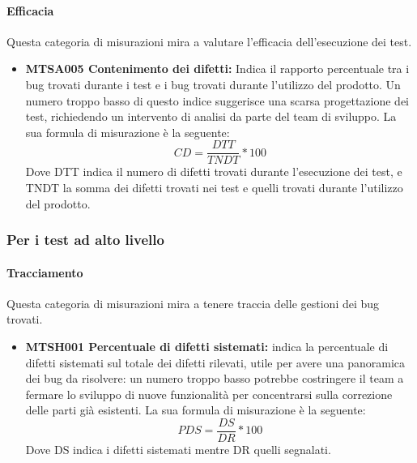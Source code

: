 \documentclass[NormeDiProgetto.tex]{subfiles}
\begin{document}
	\paragraph{Efficacia}
	Questa categoria di misurazioni mira a valutare l'efficacia dell'esecuzione dei test.
	\begin{itemize}
		\item \textbf{MTSA005 Contenimento dei difetti:} Indica il rapporto percentuale tra i bug trovati durante i test e i bug trovati durante l'utilizzo del prodotto. Un numero troppo basso di questo indice suggerisce una scarsa progettazione dei test, richiedendo un intervento di analisi da parte del team di sviluppo. La sua formula di misurazione è la seguente:
		\[CD=\dfrac{DTT}{TNDT}*100\]
		Dove DTT indica il numero di difetti trovati durante l'esecuzione dei test, e TNDT la somma dei difetti trovati nei test e quelli trovati durante l'utilizzo del prodotto.
	\end{itemize}
	
	\subsubsection{Per i test ad alto livello}
	\paragraph{Tracciamento}
	Questa categoria di misurazioni mira a tenere traccia delle gestioni dei bug trovati.
	\begin{itemize}
		\item \textbf{MTSH001 Percentuale di difetti sistemati:} indica la percentuale di difetti sistemati sul totale dei difetti rilevati, utile per avere una panoramica dei bug da risolvere: un numero troppo basso potrebbe costringere il team a fermare lo sviluppo di nuove funzionalità per concentrarsi sulla correzione delle parti già esistenti. La sua formula di misurazione è la seguente:
		\[PDS=\dfrac{DS}{DR}*100\]
		Dove DS indica i difetti sistemati mentre DR quelli segnalati.	
	\end{itemize}
\end{document}
